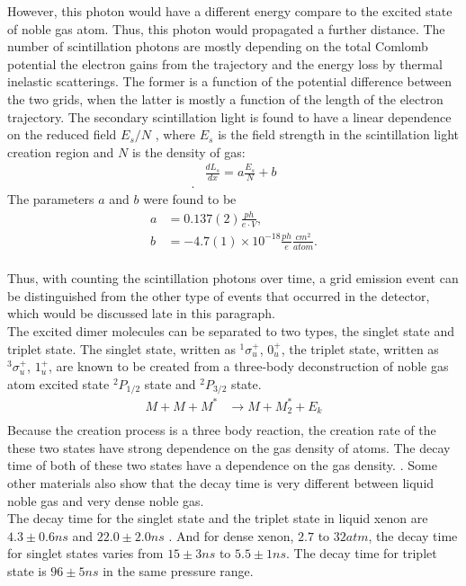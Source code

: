 However, this photon would have a different energy compare to the excited state of noble gas atom. Thus, this photon would propagated a further distance. The number of scintillation photons are mostly depending on the total Comlomb potential the electron gains from the trajectory and the energy loss by thermal inelastic scatterings. The former is a function of the potential difference between the two grids, when the latter is mostly a function of the length of the electron trajectory. The secondary scintillation light is found to have a linear dependence on the reduced field $E_s/N$ \cite{Monteiro2007}, where $E_s$ is the field strength in the scintillation light creation region and $N$ is the density of gas:
\begin{align}
&\frac{dL_s}{dx}=a \frac{E_s}{N} + b \\.
\end{align} 
The parameters $a$ and $b$ were found to be
\begin{align}
a &= 0.137(2)\frac{ph}{e\cdot V}, \\
b &= -4.7(1) \times 10^{-18} \frac{ph}{e} \frac{cm^2}{atom}.
\end{align}
\\
Thus, with counting the scintillation photons over time, a grid emission event can be distinguished from the other type of events that occurred in the detector, which would be discussed late in this paragraph.\\ 
The excited dimer molecules can be separated to two types, the singlet state and triplet state. The singlet state, written as $^1\sigma_u^+$, $0_u^+$, the triplet state, written as $^3\sigma_u^+$, $1_u^+$,  are known to be created from a three-body deconstruction of noble gas atom excited state $^2P_{1/2}$ state and $^2P_{3/2}$ state.  \\
\begin{align}
M + M + M^* &\rightarrow M + M_2^* +E_k\\
\end{align}
Because the creation process is a three body reaction, the creation rate of the these two states have strong dependence on the gas density of atoms. The decay time of both of these two states have a dependence on the gas density. \cite{Keto1974}. Some other materials also show that the decay time is very different between liquid noble gas and very dense noble gas. \\
The decay time for the singlet state and the triplet state in liquid xenon are $4.3 \pm 0.6 ns$ and $22.0 \pm 2.0 ns$ \cite{Hitachi1983}. And for dense xenon, $2.7$ to $32 atm$, the decay time for singlet states varies from $15 \pm 3 ns$ to $5.5 \pm 1 ns$. The decay time for triplet state is $96 \pm 5 ns$ in the same pressure range.\\
